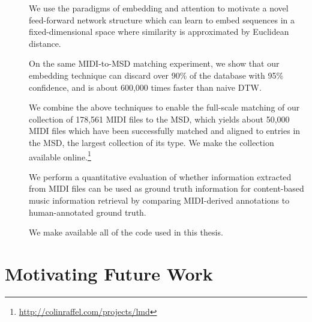 \begin{description}
\item[] We use the paradigms of embedding and attention to motivate a novel feed-forward network structure which can learn to embed sequences in a fixed-dimensional space where similarity is approximated by Euclidean distance.

\item[] On the same MIDI-to-MSD matching experiment, we show that our embedding technique can discard over 90\% of the database with 95\% confidence, and is about 600,000 times faster than naive DTW.

\item[] We combine the above techniques to enable the full-scale matching of our collection of 178,561 MIDI files to the MSD, which yields about 50,000 MIDI files which have been successfully matched and aligned to entries in the MSD, the largest collection of its type.  We make the collection available online.\footnote{\url{http://colinraffel.com/projects/lmd}}

\item[] We perform a quantitative evaluation of whether information extracted from MIDI files can be used as ground truth information for content-based music information retrieval by comparing MIDI-derived annotations to human-annotated ground truth.

\item[] We make available all of the code used in this thesis.

\end{description}

\section{Motivating Future Work}
\label{sec:ideas}

